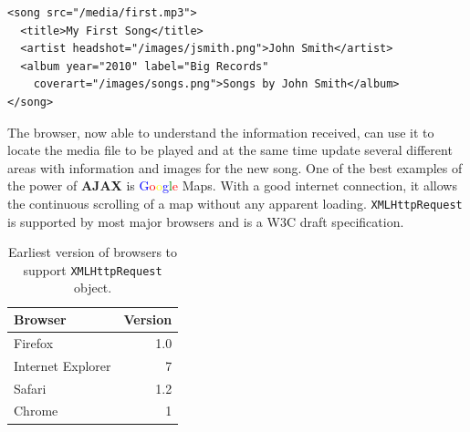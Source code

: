 \documentclass[10pt,a4paper]{article}
\begin{document}
\begin{verbatim}
<song src="/media/first.mp3">
  <title>My First Song</title>
  <artist headshot="/images/jsmith.png">John Smith</artist>
  <album year="2010" label="Big Records"
  	coverart="/images/songs.png">Songs by John Smith</album>
</song>
\end{verbatim}

The browser, now able to understand the information received, can use it to locate the media file to be played and at the same time update several different areas with information and images for the new song. One of the best examples of the power of \textbf{AJAX} is \textcolor{blue}{G}\textcolor{red}{o}\textcolor{yellow}{o}\textcolor{blue}{g}\textcolor{green}{l}\textcolor{red}{e} Maps\cite{Google:maps}. With a good internet connection, it allows the continuous scrolling of a map without any apparent loading. \texttt{XMLHttpRequest} is supported by most major browsers\cite{MDN:XML} and is a W3C draft specification\cite{W3C:XML}.
\begin{table}[h]
	\centering
	\begin{tabular}{|l|r|}
	\hline
	\textbf{Browser} & \textbf{Version}\\
	\hline
	Firefox & 1.0\\
	\hline
	Internet Explorer & 7\\
	\hline
	Safari & 1.2\\
	\hline
	Chrome & 1\\
	\hline
	\end{tabular}
	\caption{Earliest version of browsers to support \texttt{XMLHttpRequest} object\cite{MDN:XML}.}
	\label{tab:support}
\end{table}

\newpage
\listoffigures

\newpage
{}

\end{document}
